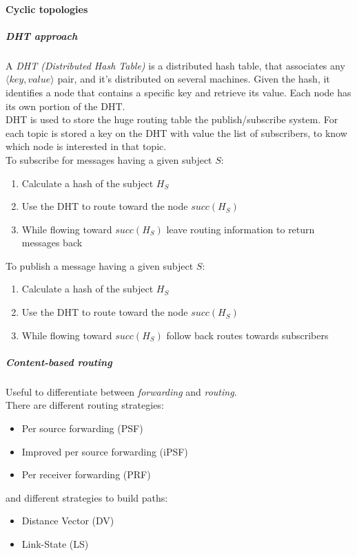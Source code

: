 \documentclass[10pt,a4paper]{article}
\begin{document}
\paragraph{Cyclic topologies}
\subparagraph{DHT approach}
A \textit{DHT (Distributed Hash Table)} is a distributed hash table, that associates any $\langle key,value \rangle$ pair, and it's distributed on several machines. Given the hash, it identifies a node that contains a specific key and retrieve its value. Each node has its own portion of the DHT.\\
DHT is used to store the huge routing table the publish/subscribe system. For each topic is stored a key on the DHT with value the list of subscribers, to know which node is interested in that topic.
\\ To subscribe for messages having a given subject $S$:
\begin{enumerate}
	\item Calculate a hash of the subject $H_S$
	\item Use the DHT to route toward the node $succ(H_S)$
	\item While flowing toward $succ(H_S)$ leave routing information to return messages back
\end{enumerate}
 To publish a message having a given subject $S$:
\begin{enumerate}
	\item Calculate a hash of the subject $H_S$
	\item Use the DHT to route toward the node $succ(H_S)$
	\item While flowing toward $succ(H_S)$ follow back routes towards subscribers
\end{enumerate}
\subparagraph{Content-based routing}
Useful to differentiate between \textit{forwarding} and \textit{routing}. \\
There are different routing strategies:
\begin{itemize}
	\item Per source forwarding (PSF)
	\item Improved per source forwarding (iPSF)
	\item Per receiver forwarding (PRF)
\end{itemize}
and different strategies to build paths:
\begin{itemize}
	\item Distance Vector (DV)
	\item Link-State (LS)
\end{itemize}
\end{document}
